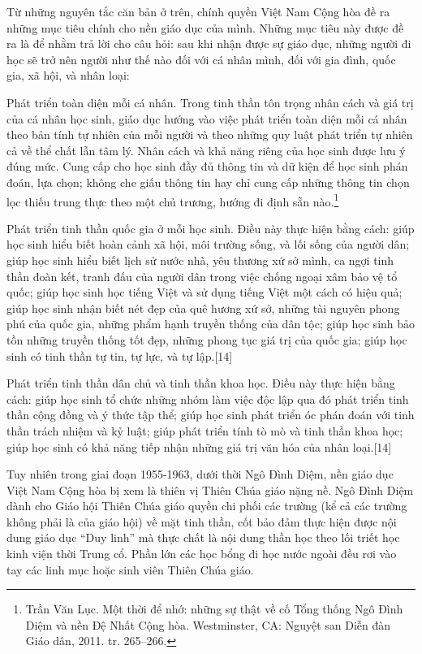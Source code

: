 \documentclass[../thesis.tex]{subfiles}
\begin{document}
Từ những nguyên tắc căn bản ở trên, chính quyền Việt Nam Cộng hòa đề ra những mục tiêu chính cho nền giáo dục của mình. Những mục tiêu này được đề ra là để nhằm trả lời cho câu hỏi: sau khi nhận được sự giáo dục, những người đi học sẽ trở nên người như thế nào đối với cá nhân mình, đối với gia đình, quốc gia, xã hội, và nhân loại:

Phát triển toàn diện mỗi cá nhân. Trong tinh thần tôn trọng nhân cách và giá trị của cá nhân học sinh, giáo dục hướng vào việc phát triển toàn diện mỗi cá nhân theo bản tính tự nhiên của mỗi người và theo những quy luật phát triển tự nhiên cả về thể chất lẫn tâm lý. Nhân cách và khả năng riêng của học sinh được lưu ý đúng mức. Cung cấp cho học sinh đầy đủ thông tin và dữ kiện để học sinh phán đoán, lựa chọn; không che giấu thông tin hay chỉ cung cấp những thông tin chọn lọc thiếu trung thực theo một chủ trương, hướng đi định sẵn nào.\footnote{Trần Văn Lục. Một thời để nhớ: những sự thật về cố Tổng thống Ngô Đình Diệm và nền Đệ Nhất Cộng hòa. Westminster, CA: Nguyệt san Diễn đàn Giáo dân, 2011. tr. 265–266.}

Phát triển tinh thần quốc gia ở mỗi học sinh. Điều này thực hiện bằng cách: giúp học sinh hiểu biết hoàn cảnh xã hội, môi trường sống, và lối sống của người dân; giúp học sinh hiểu biết lịch sử nước nhà, yêu thương xứ sở mình, ca ngợi tinh thần đoàn kết, tranh đấu của người dân trong việc chống ngoại xâm bảo vệ tổ quốc; giúp học sinh học tiếng Việt và sử dụng tiếng Việt một cách có hiệu quả; giúp học sinh nhận biết nét đẹp của quê hương xứ sở, những tài nguyên phong phú của quốc gia, những phẩm hạnh truyền thống của dân tộc; giúp học sinh bảo tồn những truyền thống tốt đẹp, những phong tục giá trị của quốc gia; giúp học sinh có tinh thần tự tin, tự lực, và tự lập.[14]

Phát triển tinh thần dân chủ và tinh thần khoa học. Điều này thực hiện bằng cách: giúp học sinh tổ chức những nhóm làm việc độc lập qua đó phát triển tinh thần cộng đồng và ý thức tập thể; giúp học sinh phát triển óc phán đoán với tinh thần trách nhiệm và kỷ luật; giúp phát triển tính tò mò và tinh thần khoa học; giúp học sinh có khả năng tiếp nhận những giá trị văn hóa của nhân loại.[14]

Tuy nhiên trong giai đoạn 1955-1963, dưới thời Ngô Đình Diệm, nền giáo dục Việt Nam Cộng hòa bị xem là thiên vị Thiên Chúa giáo nặng nề. Ngô Đình Diệm dành cho Giáo hội Thiên Chúa giáo quyền chi phối các trường (kể cả các trường không phải là của giáo hội) về mặt tinh thần, cốt bảo đảm thực hiện được nội dung giáo dục “Duy linh” mà thực chất là nội dung thần học theo lối triết học kinh viện thời Trung cổ. Phần lớn các học bổng đi học nước ngoài đều rơi vào tay các linh mục hoặc sinh viên Thiên Chúa giáo.
\end{document}
